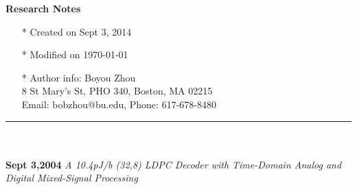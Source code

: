 \documentclass[]{article}
\begin{document}
\pagestyle{empty}
{\large\textbf{Research Notes}}
\begin{itemize}
    \item[*] Created on Sept 3, 2014
    \item[*] Modified on \today
    \item[*] Author info: Boyou Zhou\\
             8 St Mary's St, PHO 340, Boston, MA 02215\\
             Email: bobzhou@bu.edu, Phone: 617-678-8480
\end{itemize}


\rule[-0.1cm]{7.5in}{0.01cm}\\
\\
\noindent \textbf{Sept 3,2004}
\textit{A 10.4pJ/b (32,8) LDPC Decoder with Time-Domain Analog and Digital Mixed-Signal Processing}
\end{document}
